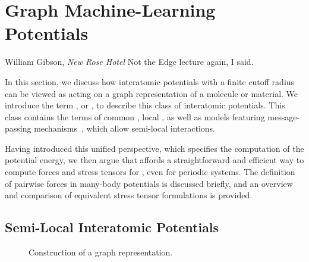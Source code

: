
\chapter{Graph Machine-Learning Potentials}
\label{ch:glps}


\begin{chapquote}{William Gibson, \textit{New Rose Hotel}}
    Not the Edge lecture again, I said.
\end{chapquote}

\noindent
In this section, we discuss how interatomic potentials with a finite cutoff radius can be viewed as acting on a graph representation of a molecule or material. We introduce the term , or , to describe this class of interatomic potentials.
This class contains the  terms of common \ffs, local \mlps, as well as models featuring message-passing mechanisms~\cite{gsvd2017q}, which allow semi-local interactions.

Having introduced this unified perspective, which specifies the  computation of the potential energy, we then argue that \ad affords a straightforward and efficient way to compute forces and stress tensors for \glps, even for periodic systems.
The definition of pairwise forces in many-body potentials is discussed briefly, and an overview and comparison of equivalent stress tensor formulations is provided.

\section{Semi-Local Interatomic Potentials}

\begin{figure*}
    \caption{Construction of a graph representation.}
    \label{fig:glp-sketch_graph}
\end{figure*}

